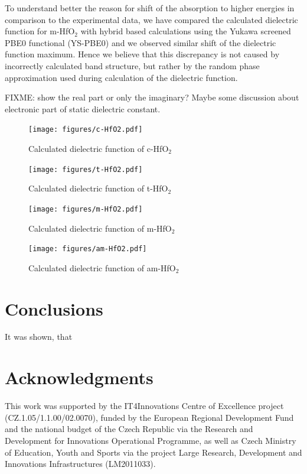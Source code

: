 \documentclass[10pt,a4paper,twocolumn]{article}
\begin{document}
To understand better the reason for shift of the absorption to higher energies in comparison to the experimental data, we have compared the calculated dielectric function for m-HfO$_2$ with hybrid based calculations using the Yukawa screened PBE0 functional (YS-PBE0) \cite{Tran2011} and we observed similar shift of the dielectric function maximum.
Hence we believe that this discrepancy is not caused by incorrectly calculated band structure, but rather by the random phase approximation used during calculation of the dielectric function.

FIXME: show the real part or only the imaginary? Maybe some discussion about electronic part of static dielectric constant.

\begin{figure}
\begin{center}
	\texttt{[image: figures/c-HfO2.pdf]}
	\caption{Calculated dielectric function of c-HfO$_2$}
   \label{eps-cHfO2}
\end{center}
\end{figure}

\begin{figure}
\begin{center}
	\texttt{[image: figures/t-HfO2.pdf]}
	\caption{Calculated dielectric function of t-HfO$_2$}
   \label{eps-tHfO2}
\end{center}
\end{figure}

\begin{figure}
\begin{center}
	\texttt{[image: figures/m-HfO2.pdf]}
	\caption{Calculated dielectric function of m-HfO$_2$}
   \label{eps-mHfO2}
\end{center}
\end{figure}

\begin{figure}
\begin{center}
	\texttt{[image: figures/am-HfO2.pdf]}
	\caption{Calculated dielectric function of am-HfO$_2$}
   \label{eps-amHfO2}
\end{center}
\end{figure}


\section{Conclusions}

It was shown, that

\section*{Acknowledgments}
This work was supported by the IT4Innovations Centre of Excellence project (CZ.1.05/1.1.00/02.0070), funded by the European Regional Development Fund and the national budget of the Czech Republic via the Research and Development for Innovations Operational Programme, as well as Czech Ministry of Education, Youth and Sports via the project Large Research, Development and Innovations Infrastructures (LM2011033).



\end{document}

